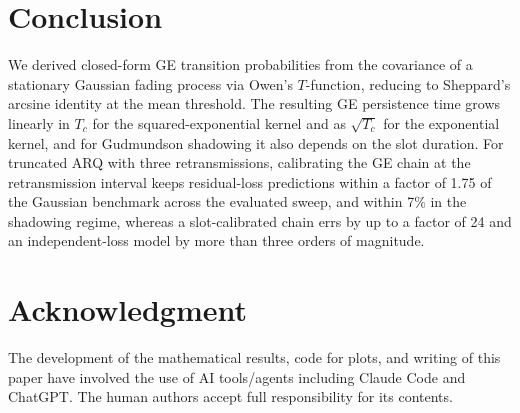 \documentclass[conference]{IEEEtran}
\begin{document}
\section{Conclusion}
We derived closed-form GE transition probabilities from the covariance of a stationary Gaussian fading process via Owen's $T$-function, reducing to Sheppard's arcsine identity at the mean threshold. The resulting GE persistence time grows linearly in $T_c$ for the squared-exponential kernel and as $\sqrt{T_c}$ for the exponential kernel, and for Gudmundson shadowing it also depends on the slot duration. For truncated ARQ with three retransmissions, calibrating the GE chain at the retransmission interval keeps residual-loss predictions within a factor of 1.75 of the Gaussian benchmark across the evaluated sweep, and within 7\% in the shadowing regime, whereas a slot-calibrated chain errs by up to a factor of 24 and an independent-loss model by more than three orders of magnitude.

\section*{Acknowledgment}
The development of the mathematical results, code for plots, and writing of this paper have involved the use of AI tools/agents including Claude Code and ChatGPT. The human authors accept full responsibility for its contents.



\end{document}
